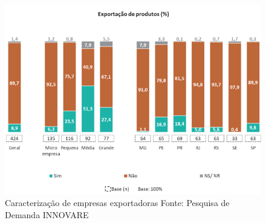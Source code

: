 \begin{figure}[h]
    \centering
    \includegraphics[scale=0.75]{Imagens/Exportacao_2.PNG}
    \caption{Caracterização de empresas exportadoras Fonte: Pesquisa de Demanda INNOVARE}
\end{figure}